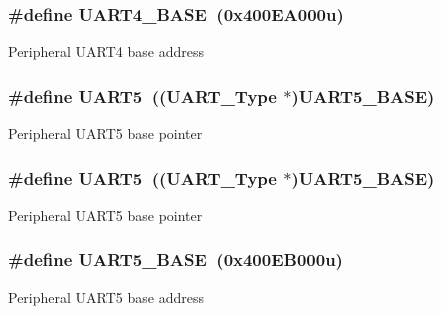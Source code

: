 \subsubsection[{\texorpdfstring{U\+A\+R\+T4\+\_\+\+B\+A\+SE}{UART4_BASE}}]{\setlength{\rightskip}{0pt plus 5cm}\#define U\+A\+R\+T4\+\_\+\+B\+A\+SE~(0x400\+E\+A000u)}\hypertarget{group__UART__Peripheral__Access__Layer_ga94d92270bf587ccdc3a37a5bb5d20467}{}\label{group__UART__Peripheral__Access__Layer_ga94d92270bf587ccdc3a37a5bb5d20467}
Peripheral U\+A\+R\+T4 base address 
\subsubsection[{\texorpdfstring{U\+A\+R\+T5}{UART5}}]{\setlength{\rightskip}{0pt plus 5cm}\#define U\+A\+R\+T5~(({\bf U\+A\+R\+T\+\_\+\+Type} $\ast$){\bf U\+A\+R\+T5\+\_\+\+B\+A\+SE})}\hypertarget{group__UART__Peripheral__Access__Layer_ga9274e37cf5e8a174fc5dd627b98ec0fe}{}\label{group__UART__Peripheral__Access__Layer_ga9274e37cf5e8a174fc5dd627b98ec0fe}
Peripheral U\+A\+R\+T5 base pointer 
\subsubsection[{\texorpdfstring{U\+A\+R\+T5}{UART5}}]{\setlength{\rightskip}{0pt plus 5cm}\#define U\+A\+R\+T5~(({\bf U\+A\+R\+T\+\_\+\+Type} $\ast$){\bf U\+A\+R\+T5\+\_\+\+B\+A\+SE})}\hypertarget{group__UART__Peripheral__Access__Layer_ga9274e37cf5e8a174fc5dd627b98ec0fe}{}\label{group__UART__Peripheral__Access__Layer_ga9274e37cf5e8a174fc5dd627b98ec0fe}
Peripheral U\+A\+R\+T5 base pointer 
\subsubsection[{\texorpdfstring{U\+A\+R\+T5\+\_\+\+B\+A\+SE}{UART5_BASE}}]{\setlength{\rightskip}{0pt plus 5cm}\#define U\+A\+R\+T5\+\_\+\+B\+A\+SE~(0x400\+E\+B000u)}\hypertarget{group__UART__Peripheral__Access__Layer_gaa155689c0e206e6994951dc3cf31052a}{}\label{group__UART__Peripheral__Access__Layer_gaa155689c0e206e6994951dc3cf31052a}
Peripheral U\+A\+R\+T5 base address 
